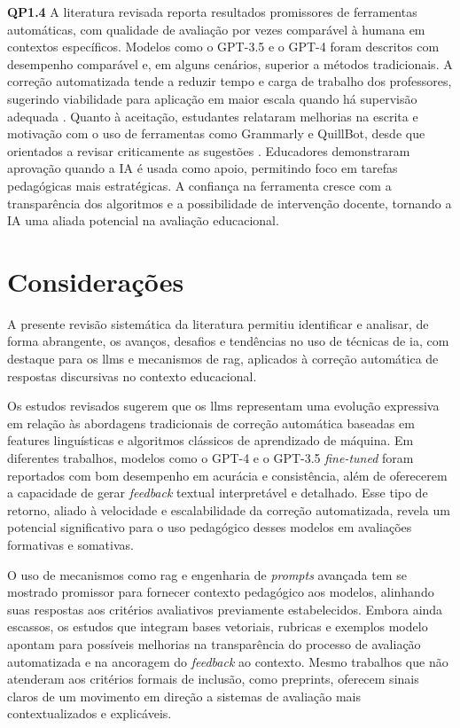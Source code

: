 \textbf{QP1.4}
A literatura revisada reporta resultados promissores de ferramentas automáticas, com qualidade de avaliação por vezes comparável à humana em contextos específicos. Modelos como o GPT-3.5 e o GPT-4 foram descritos com desempenho comparável e, em alguns cenários, superior a métodos tradicionais. A correção automatizada tende a reduzir tempo e carga de trabalho dos professores, sugerindo viabilidade para aplicação em maior escala quando há supervisão adequada \cite{xiao_human-ai_2025}. Quanto à aceitação, estudantes relataram melhorias na escrita e motivação com o uso de ferramentas como Grammarly e QuillBot, desde que orientados a revisar criticamente as sugestões \cite{fiki_setiawan_exploring_2025}. Educadores demonstraram aprovação quando a IA é usada como apoio, permitindo foco em tarefas pedagógicas mais estratégicas. A confiança na ferramenta cresce com a transparência dos algoritmos e a possibilidade de intervenção docente, tornando a IA uma aliada potencial na avaliação educacional.

\section{Considerações}

A presente revisão sistemática da literatura permitiu identificar e analisar, de forma abrangente, os avanços, desafios e tendências no uso de técnicas de \gls{ia}, com destaque para os \gls{llm}s e mecanismos de \gls{rag}, aplicados à correção automática de respostas discursivas no contexto educacional.

Os estudos revisados sugerem que os \gls{llm}s representam uma evolução expressiva em relação às abordagens tradicionais de correção automática baseadas em features linguísticas e algoritmos clássicos de aprendizado de máquina. Em diferentes trabalhos, modelos como o GPT-4 e o GPT-3.5 \textit{fine-tuned} foram reportados com bom desempenho em acurácia e consistência, além de oferecerem a capacidade de gerar \textit{feedback} textual interpretável e detalhado. Esse tipo de retorno, aliado à velocidade e escalabilidade da correção automatizada, revela um potencial significativo para o uso pedagógico desses modelos em avaliações formativas e somativas.

O uso de mecanismos como \gls{rag} e engenharia de \textit{prompts} avançada tem se mostrado promissor para fornecer contexto pedagógico aos modelos, alinhando suas respostas aos critérios avaliativos previamente estabelecidos. Embora ainda escassos, os estudos que integram bases vetoriais, rubricas e exemplos modelo apontam para possíveis melhorias na transparência do processo de avaliação automatizada e na ancoragem do \textit{feedback} ao contexto. Mesmo trabalhos que não atenderam aos critérios formais de inclusão, como preprints, oferecem sinais claros de um movimento em direção a sistemas de avaliação mais contextualizados e explicáveis.

